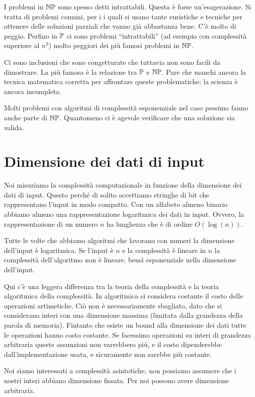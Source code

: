 I problemi in $\mathbb{NP}$ sono spesso detti intrattabili. Questa è forse un'esagerazione. Si tratta
di problemi comuni, per i i quali si usano tante euristiche e tecniche per ottenere delle soluzioni
parziali che vanno già abbastanza bene. C'è molto di peggio. Perfino in $\mathbb{P}$ ci sono problemi
``intrattabili'' (ad esempio con complessità superiore al $n^{3}$) molto peggiori dei più famosi
problemi in $\mathbb{NP}$.

Ci sono inclusioni che sono congetturate che tuttavia non sono facili da dimostrare. La più famosa
è la relazione tra $\mathbb{P}$ e $\mathbb{NP}$. Pare che manchi ancora la tecnica matematica corretta
per affrontare queste problematiche; la scienza è ancora incompleta.

Molti problemi con algoritmi di complessità esponenziale nel caso pessimo fanno anche parte di
$\mathbb{NP}$. Quantomeno ci è agevole verificare che una soluzione sia valida.

\section{Dimensione dei dati di input}

Noi misuriamo la complessità computazionale in funzione della dimensione dei dati di input. Questo
perché di solito accettiamo stringhe di bit che rappresentano l'input in modo compatto. Con un
alfabeto almeno binario abbiamo almeno una rappresentazione logaritmica dei dati in input. Ovvero,
la rappresentazione di un numero $n$ ha lunghezza che è di ordine $O(\log(n))$.

Tutte le volte che abbiamo algoritmi che lavorano con numeri la dimensione dell'input è
logaritmica. Se l'input è $n$ e la complessità è lineare in $n$ la complessità dell'algoritmo
non è lineare, bensì esponenziale nella dimensione dell'input.

Qui c'è una leggera differenza tra la teoria della complessità e la teoria algoritmica della
complessità. In algoritmica si considera costante il costo delle operazioni artimetiche. Ciò non è
necessariamente sbagliato, dato che si considerano interi con una dimensione massima (limitata dalla
grandezza della parola di memoria). Fintanto che esiste un bound alla dimensione dei dati tutte le
operazioni hanno costo costante. Se facessimo operazioni su interi di grandezza arbitraria queste
assunzioni non varrebbero più, e il costo dipenderebbe dall'implementazione usata, e sicuramente non
sarebbe più costante.

Noi siamo interessati a complessità asintotiche, non possiamo assumere che i nostri interi abbiano
dimensione fissata. Per noi possono avere dimensione arbitraria.

